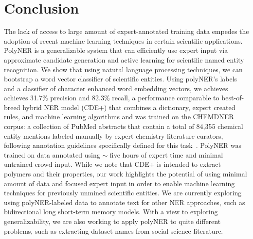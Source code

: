 \section{Conclusion}
\label{sect:apner_conclusion}
The lack of access to large amount of expert-annotated training data empedes the adoption of recent machine learning techniques in certain scientific applications.
PolyNER is a generalizable system that can efficiently use expert input via approximate candidate generation and active learning for scientific named entity recognition.
We show that using natutal language processing techniques, we can bootstrap a word vector classifier of scientific entities.
Using polyNER's labels and a classifier of character enhanced word embedding vectors, we achieves achieves 31.7\% precision and 82.3\% recall,  a performance comparable to best-of-breed
hybrid NER model (CDE+) that combines a dictionary, expert created
rules, and machine learning algorithms and was trained on the CHEMDNER corpus:
a collection of  PubMed abstracts that contain a total of 84,355 chemical entity mentions labeled manually by expert chemistry literature curators, following annotation guidelines specifically defined for this task~\cite{krallinger2015chemdner}. 
PolyNER was trained on data annotated using $\sim$ five hours of expert time and minimal untrained crowd input.
While we note that CDE+ is intended to extract polymers and their properties, our work highlights the potential of using minimal amount of data and focused expert input in order to enable machine learning techniques for previously unmined scientific entities. 
We are currently exploring using polyNER-labeled data to annotate text for other NER approaches,
such as bidirectional long short-term memory models.
With a view to exploring generalizability, we are also working to apply polyNER
to quite different problems, such as extracting dataset names from social science
literature. 